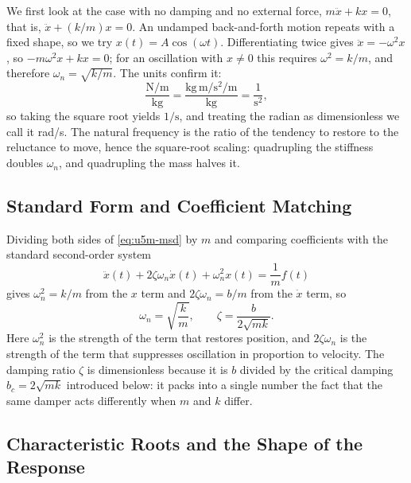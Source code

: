 We first look at the case with no damping and no external force,
$m\ddot{x}+kx=0$, that is, $\ddot{x}+(k/m)x=0$.
An undamped back-and-forth motion repeats with a fixed shape, so we try
$x(t)=A\cos(\omega t)$.
Differentiating twice gives $\ddot{x}=-\omega^2 x$, so
$-m\omega^2 x+kx=0$; for an oscillation with $x\neq0$ this requires
$\omega^2=k/m$, and therefore $\omega_n=\sqrt{k/m}$.
The units confirm it:
\begin{equation}
  \frac{\mathrm{N/m}}{\mathrm{kg}}
  =
  \frac{\mathrm{kg\,m/s^2}/\mathrm{m}}{\mathrm{kg}}
  =
  \frac{1}{\mathrm{s^2}},
\end{equation}
so taking the square root yields $1/\mathrm{s}$, and treating the radian
as dimensionless we call it rad/s.
The natural frequency is the ratio of the tendency to restore to the
reluctance to move, hence the square-root scaling: quadrupling the
stiffness doubles $\omega_n$, and quadrupling the mass halves it.

\subsection{Standard Form and Coefficient Matching}

Dividing both sides of \eqref{eq:u5m-msd} by $m$ and comparing
coefficients with the standard second-order system
\begin{equation}
  \ddot{x}(t)+2\zeta\omega_n\dot{x}(t)+\omega_n^2 x(t)=\frac{1}{m}f(t)
  \label{eq:u5m-standard}
\end{equation}
gives $\omega_n^2=k/m$ from the $x$ term and $2\zeta\omega_n=b/m$ from the
$\dot{x}$ term, so
\begin{equation}
  \omega_n=\sqrt{\frac{k}{m}}, \qquad \zeta=\frac{b}{2\sqrt{mk}}.
\end{equation}
Here $\omega_n^2$ is the strength of the term that restores position, and
$2\zeta\omega_n$ is the strength of the term that suppresses oscillation
in proportion to velocity.
The damping ratio $\zeta$ is dimensionless because it is $b$ divided by
the critical damping $b_c=2\sqrt{mk}$ introduced below: it packs into a
single number the fact that the same damper acts differently when $m$ and
$k$ differ.

\subsection{Characteristic Roots and the Shape of the Response}

